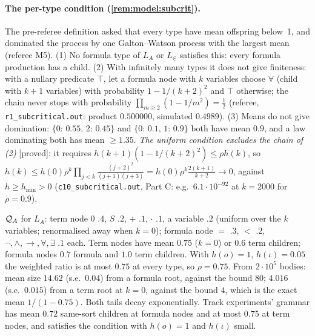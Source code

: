 \paragraph{The per-type condition (\cref{rem:model:subcrit}).} The pre-referee definition asked that every type have mean offspring below~1, and dominated the process by one Galton--Watson process with the largest mean (referee M5). (1) No formula type of $L_A$ or $L_\in$ satisfies this: every formula production has a child. (2) With infinitely many types it does not give finiteness: with a nullary predicate $\top$, let a formula node with $k$ variables choose $\forall$ (child with $k+1$ variables) with probability $1-1/(k+2)^2$ and $\top$ otherwise; the chain never stops with probability $\prod_{m\ge2}(1-1/m^2)=\tfrac12$ (referee, \texttt{r1\_subcritical.out}: product $0.500000$, simulated $0.4989$). (3) Means do not give domination: $\{0{:}\,0.55,\,2{:}\,0.45\}$ and $\{0{:}\,0.1,\,1{:}\,0.9\}$ both have mean $0.9$, and a law dominating both has mean $\ge1.35$.
\emph{The uniform condition excludes the chain of (2)} [proved]: it requires $h(k+1)(1-1/(k+2)^2)\le\rho h(k)$, so
$h(k)\le h(0)\rho^k\prod_{j<k}\frac{(j+2)^2}{(j+1)(j+3)}=h(0)\rho^k\frac{2(k+1)}{k+2}\to0$, against $h\ge h_{\min}>0$ (\texttt{c10\_subcritical.out}, Part C: e.g.\ $6.1\cdot10^{-92}$ at $k=2000$ for $\rho=0.9$).

\begin{example}\label{ex:model:qa}
$\mathcal{Q}_A$ for $L_A$: term node $0$ $.4$, $S$ $.2$, $+$ $.1$, $\cdot$ $.1$, a variable $.2$ (uniform over the $k$ variables; renormalised away when $k=0$); formula node $=$ $.3$, $<$ $.2$, $\neg,\wedge,\to,\forall,\exists$ $.1$ each. Term nodes have mean $0.75$ ($k=0$) or $0.6$ term children; formula nodes $0.7$ formula and $1.0$ term children. With $h(o)=1$, $h(\iota)=0.05$ the weighted ratio is at most $0.75$ at every type, so $\rho=0.75$. From $2\cdot10^5$ bodies: mean size $14.62$ (s.e.\ $0.04$) from a formula root, against the bound $80$; $4.016$ (s.e.\ $0.015$) from a term root at $k=0$, against the bound $4$, which is the exact mean $1/(1-0.75)$. Both tails decay exponentially. Track experiments' grammar has mean $0.72$ same-sort children at formula nodes and at most $0.75$ at term nodes, and satisfies the condition with $h(o)=1$ and $h(\iota)$ small.
\end{example}

